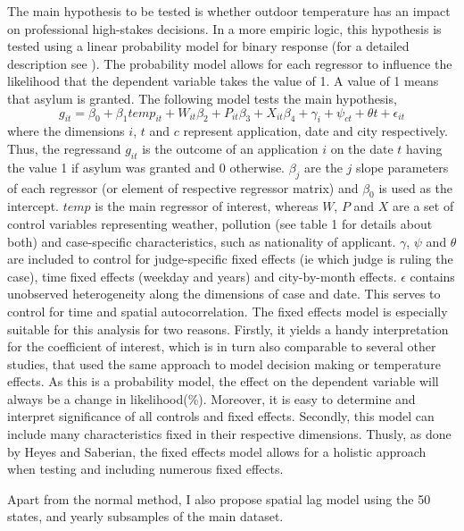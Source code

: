 \documentclass[11pt]{article}
\begin{document}
The main hypothesis to be tested is whether outdoor temperature has an impact on professional high-stakes decisions. In a more empiric logic, this hypothesis is tested using a linear probability model for binary response (for a detailed description see \cite{wooldridge2010econometric}). The probability model allows for each regressor to influence the likelihood that the dependent variable takes the value of 1. A value of 1 means that asylum is granted. The following model tests the main hypothesis, 
\newline
\begin{equation}
	g_{ it } = \beta_{0} + \beta_{1 }temp_{it} + W_{it}\beta_{2} + P_{it}\beta_{3} + X_{it}\beta_{4} + \gamma_{i} + \psi_{ct} + \theta{t} + \epsilon_{it}
\end{equation}
where the dimensions \(i\), \(t\) and \(c\) represent application, date and city respectively. Thus, the regressand \(g_{ it }\) is the outcome of an application \(i\) on the date \(t\) having the value 1 if asylum was granted and 0 otherwise. \(\beta_{j}\) are the \(j\) slope parameters of each regressor (or element of respective regressor matrix) and \(\beta_{0}\) is used as the intercept. \(temp\) is the main regressor of interest, whereas \(W\), \(P\) and \(X\) are a set of control variables representing weather, pollution (see table 1 for details about both) and case-specific characteristics, such as nationality of applicant. \(\gamma\), \(\psi\) and \(\theta\) are included to control for judge-specific fixed effects (ie which judge is ruling the case), time fixed effects (weekday and years) and city-by-month effects. \(\epsilon\) contains unobserved heterogeneity along the dimensions of case and date. This serves to control for time and spatial autocorrelation. 
The fixed effects model is especially suitable for this analysis for two reasons. Firstly, it yields a handy interpretation for the coefficient of interest, which is in turn also comparable to several other studies, that used the same approach to model decision making or temperature effects. As this is a probability model, the effect on the dependent variable will always be a change in likelihood(\%). Moreover, it is easy to determine and interpret significance of all controls and fixed effects. Secondly, this model can include many characteristics fixed in their respective dimensions. Thusly, as done by Heyes and Saberian, the fixed effects model allows for a holistic approach when testing and including numerous fixed effects.

Apart from the normal method, I also propose spatial lag model using the 50 states, and yearly subsamples of the main dataset.
\end{document}
